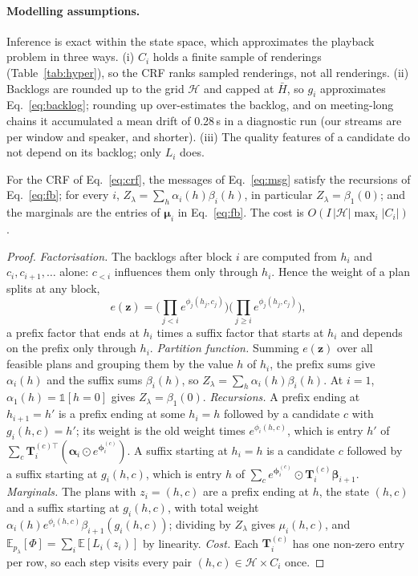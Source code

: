 \paragraph{Modelling assumptions.} Inference is exact within the state space, which approximates the playback problem
in three ways. (i) $C_i$ holds a finite sample of renderings (Table~\ref{tab:hyper}), so the CRF ranks sampled
renderings, not all renderings. (ii) Backlogs are rounded up to the grid $\mathcal{H}$ and capped at $\bar H$, so $g_i$
approximates Eq.~\eqref{eq:backlog}; rounding up over-estimates the backlog, and on meeting-long chains it accumulated a
mean drift of 0.28\,s in a diagnostic run (our streams are per window and speaker, and shorter). (iii) The quality
features of a candidate do not depend on its backlog; only $L_i$ does.

\begin{proposition}
\label{prop:fb}
For the CRF of Eq.~\eqref{eq:crf}, the messages of Eq.~\eqref{eq:msg} satisfy the recursions of Eq.~\eqref{eq:fb};
for every $i$, $Z_\lambda=\sum_h\alpha_i(h)\beta_i(h)$, in particular $Z_\lambda=\beta_1(0)$; and the marginals are the
entries of $\bm{\mu}_i$ in Eq.~\eqref{eq:fb}. The cost is $O(I\,|\mathcal{H}|\max_i|C_i|)$.
\end{proposition}

\begin{proof}
\emph{Factorisation.} The backlogs after block $i$ are computed from $h_i$ and $c_i,c_{i+1},\dots$ alone: $c_{<i}$
influences them only through $h_i$. Hence the weight of a plan splits at any block,
\[
e(\bm{z})=\Big(\textstyle\prod_{j<i}e^{\phi_j(h_j,c_j)}\Big)\Big(\textstyle\prod_{j\ge i}e^{\phi_j(h_j,c_j)}\Big),
\]
a prefix factor that ends at $h_i$ times a suffix factor that starts at $h_i$ and depends on the prefix only through
$h_i$.
\emph{Partition function.} Summing $e(\bm{z})$ over all feasible plans and grouping them by the value $h$ of $h_i$, the
prefix sums give $\alpha_i(h)$ and the suffix sums $\beta_i(h)$, so $Z_\lambda=\sum_h\alpha_i(h)\beta_i(h)$. At $i=1$,
$\alpha_1(h)=\mathds{1}[h=0]$ gives $Z_\lambda=\beta_1(0)$.
\emph{Recursions.} A prefix ending at $h_{i+1}=h'$ is a prefix ending at some $h_i=h$ followed by a candidate $c$ with
$g_i(h,c)=h'$; its weight is the old weight times $e^{\phi_i(h,c)}$, which is entry $h'$ of
$\sum_c\bm{T}_i^{(c)\top}(\bm{\alpha}_i\odot e^{\bm{\phi}_i^{(c)}})$. A suffix starting at $h_i=h$ is a candidate $c$ followed
by a suffix starting at $g_i(h,c)$, which is entry $h$ of $\sum_ce^{\bm{\phi}_i^{(c)}}\odot\bm{T}_i^{(c)}\bm{\beta}_{i+1}$.
\emph{Marginals.} The plans with $z_i=(h,c)$ are a prefix ending at $h$, the state $(h,c)$ and a suffix starting at
$g_i(h,c)$, with total weight $\alpha_i(h)e^{\phi_i(h,c)}\beta_{i+1}(g_i(h,c))$; dividing by $Z_\lambda$ gives
$\mu_i(h,c)$, and $\mathbb{E}_{p_\lambda}[\Phi]=\sum_i\mathbb{E}[L_i(z_i)]$ by linearity.
\emph{Cost.} Each $\bm{T}_i^{(c)}$ has one non-zero entry per row, so each step visits every pair
$(h,c)\in\mathcal{H}\times C_i$ once.
\end{proof}

